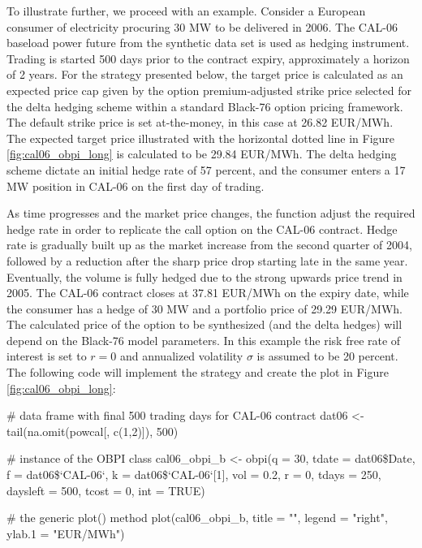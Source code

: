 To illustrate further, we proceed with an example. Consider a European consumer of electricity procuring 30 MW to be delivered in 2006. The CAL-06 baseload power future from the synthetic   data set is used as hedging instrument. Trading is started 500 days prior to the contract expiry, approximately a horizon of 2 years. For the  strategy presented below, the target price is calculated as an expected price cap given by the option premium-adjusted strike price selected for the delta hedging scheme within a standard Black-76 option pricing framework. The default  strike price is set at-the-money, in this case at 26.82 EUR/MWh. The expected target price illustrated with the horizontal dotted line in Figure \ref{fig:cal06_obpi_long} is calculated to be 29.84 EUR/MWh. The  delta hedging scheme dictate an initial hedge rate of 57 percent, and the consumer enters a 17 MW position in CAL-06 on the first day of trading.

As time progresses and the market price changes, the  function adjust the required hedge rate in order to replicate the call option on the CAL-06 contract. Hedge rate is gradually built up as the market increase from the second quarter of 2004, followed by a reduction after the sharp price drop starting late in the same year. Eventually, the volume is fully hedged due to the strong upwards price trend in 2005. The CAL-06 contract closes at 37.81 EUR/MWh on the expiry date, while the consumer has a hedge of 30 MW and a portfolio price of 29.29 EUR/MWh. The calculated price of the option to be synthesized (and the delta hedges) will depend on the Black-76 model parameters. In this example the risk free rate of interest is set to $r=0$ and annualized volatility $\sigma$ is assumed to be 20 percent. The following code will implement the strategy and create the plot in Figure \ref{fig:cal06_obpi_long}:


\begin{example*}
# data frame with final 500 trading days for CAL-06 contract
dat06 <- tail(na.omit(powcal[, c(1,2)]), 500)

# instance of the OBPI class
cal06_obpi_b <- obpi(q = 30,
\hspace{3cm} tdate = dat06\$Date,
\hspace{3cm} f = dat06\$`CAL-06`,
\hspace{3cm} k = dat06\$`CAL-06`[1],
\hspace{3cm} vol = 0.2,
\hspace{3cm} r = 0,
\hspace{3cm} tdays = 250,
\hspace{3cm} daysleft = 500,
\hspace{3cm} tcost = 0,
\hspace{3cm} int = TRUE)

# the generic plot() method
plot(cal06_obpi_b, title = "", legend = "right", ylab.1 = "EUR/MWh")
\end{example*}

